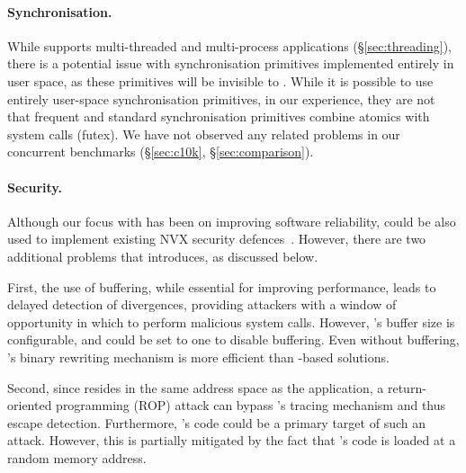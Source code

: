\paragraph{Synchronisation.} While \varan supports multi-threaded and
multi-process applications (\S\ref{sec:threading}), there is a potential issue
with synchronisation primitives implemented entirely in user space, as these
primitives will be invisible to \varan. While it is possible to use entirely
user-space synchronisation primitives, in our experience, they are not that
frequent and standard synchronisation primitives combine atomics with system
calls (\ie futex). We have not observed any related problems in our concurrent
benchmarks (\S\ref{sec:c10k}, \S\ref{sec:comparison}).

\paragraph{Security.} Although our focus with \varan has been on improving
software reliability, \varan could be also used to implement existing NVX
security defences~\cite{cox2006,orchestra09}.  However, there are two
additional problems that \varan introduces, as discussed below.

First, the use of buffering, while essential for improving performance, leads
to delayed detection of divergences, providing attackers with a window of
opportunity in which to perform malicious system calls.  However, \varan's
buffer size is configurable, and could be set to one to disable buffering. Even
without buffering, \varan's binary rewriting mechanism is more efficient than
\ptrace-based solutions.

Second, since \varan resides in the same address space as the application, a
return-oriented programming (ROP) attack can bypass \varan's tracing mechanism
and thus escape detection.  Furthermore, \varan's code could be a primary
target of such an attack. However, this is partially mitigated by the fact that
\varan's code is loaded at a random memory address.
